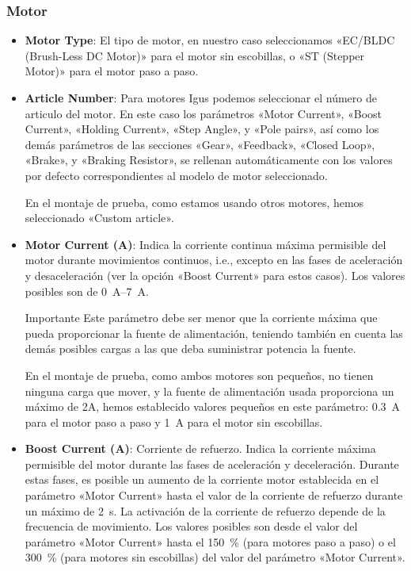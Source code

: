 \documentclass[english,spanish,a4paper,11pt]{article}
\begin{document}
\subsubsection{Motor}
\label{sec:motor_motor}

\begin{itemize}
    \item \textbf{Motor Type}: El tipo de motor, en nuestro caso seleccionamos «EC/BLDC (Brush-Less DC Motor)» para el motor sin escobillas, o «ST (Stepper Motor)» para el motor paso a paso.

    \item \textbf{Article Number}: Para motores Igus podemos seleccionar el número de articulo del motor. En este caso los parámetros «Motor Current», «Boost Current», «Holding Current», «Step Angle», y «Pole pairs», así como los demás parámetros de las secciones «Gear», «Feedback», «Closed Loop», «Brake», y «Braking Resistor», se rellenan automáticamente con los valores por defecto correspondientes al modelo de motor seleccionado.
    
    En el montaje de prueba, como estamos usando otros motores, hemos seleccionado «Custom article».

    \item \textbf{Motor Current (A)}: Indica la corriente continua máxima permisible del motor durante movimientos continuos, i.e., excepto en las fases de aceleración y desaceleración (ver la opción «Boost Current» para estos casos). Los valores posibles son de \qtyrange{0}{7}{\A}.

    \begin{admonition}{Importante}
        Este parámetro debe ser menor que la corriente máxima que pueda proporcionar la fuente de alimentación, teniendo también en cuenta las demás posibles cargas a las que deba suministrar potencia la fuente.
    \end{admonition}

    En el montaje de prueba, como ambos motores son pequeños, no tienen ninguna carga que mover, y la fuente de alimentación usada proporciona un máximo de 2A, hemos establecido valores pequeños en este parámetro: \qty{0.3}{\A} para el motor paso a paso y \qty{1}{\A} para el motor sin escobillas.

    \item \textbf{Boost Current (A)}: Corriente de refuerzo. Indica la corriente máxima permisible del motor durante las fases de aceleración y deceleración. Durante estas fases, es posible un aumento de la corriente motor establecida en el parámetro «Motor Current» hasta el valor de la corriente de refuerzo durante un máximo de \qty{2}{\s}. La activación de la corriente de refuerzo depende de la frecuencia de movimiento. Los valores posibles son desde el valor del parámetro «Motor Current» hasta el \qty{150}{\percent} (para motores paso a paso) o el \qty{300}{\percent} (para motores sin escobillas) del valor del parámetro «Motor Current».


\end{itemize}
\end{document}
